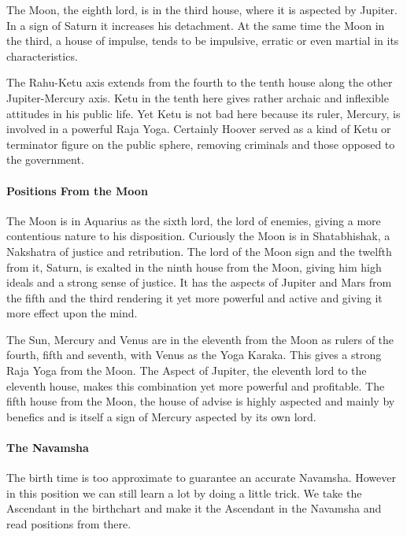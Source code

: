  

The Moon, the eighth lord, is in the third house, where it is aspected by Jupiter. In a sign of Saturn it increases his detachment. At the same time the Moon in the third, a house of impulse, tends to be impulsive, erratic or even martial in its characteristics.

 

The Rahu-Ketu axis extends from the fourth to the tenth house along the other Jupiter-Mercury axis. Ketu in the tenth here gives rather archaic and inflexible attitudes in his public life. Yet Ketu is not bad here because its ruler, Mercury, is involved in a powerful Raja Yoga. Certainly Hoover served as a kind of Ketu or terminator figure on the public sphere, removing criminals and those opposed to the government.

 

\paragraph{Positions From the Moon}

 

The Moon is in Aquarius as the sixth lord, the lord of enemies, giving a more contentious nature to his disposition. Curiously the Moon is in Shatabhishak, a Nakshatra of justice and retribution. The lord of the Moon sign and the twelfth from it, Saturn, is exalted in the ninth house from the Moon, giving him high ideals and a strong sense of justice. It has the aspects of Jupiter and Mars from the fifth and the third rendering it yet more powerful and active and giving it more effect upon the mind.

 

The Sun, Mercury and Venus are in the eleventh from the Moon as rulers of the fourth, fifth and seventh, with Venus as the Yoga Karaka. This gives a strong Raja Yoga from the Moon. The Aspect of Jupiter, the eleventh lord to the eleventh house, makes this combination yet more powerful and profitable. The fifth house from the Moon, the house of advise is highly aspected and mainly by benefics and is itself a sign of Mercury aspected by its own lord.

 

\paragraph{The Navamsha}

 

The birth time is too approximate to guarantee an accurate Navamsha. However in this position we can still learn a lot by doing a little trick. We take the Ascendant in the birthchart and make it the Ascendant in the Navamsha and read positions from there.

